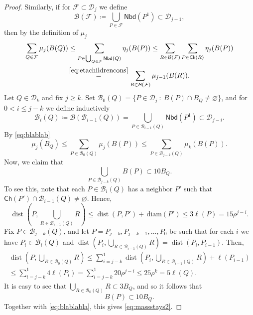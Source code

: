 \documentclass[10pt,a4paper]{amsart}
\def\dB{{\mathcal{B}}}
\def\dF{{\mathcal{F}}}
\def\dist{\mathop\mathrm{dist}} 						%
\newcommand{\Child}{\mathsf{Ch}}
\newcommand{\DD}{\mathcal{D}}
\newcommand{\Nei}{\mathsf{Nbd}}
\newcommand{\diam}{\mathrm{\, diam}}
\begin{document}
\begin{proof}
	Similarly, if for $\dF\subset\DD_j$ we define
	\begin{equation*}
	\mathcal{B}(\dF)\coloneqq \bigcup_{P\in\mathcal{F}}\Nei(P^1)\subset\DD_{j-1},
	\end{equation*}
	then by the definition of $\mu_j$
	\begin{multline}\label{eq:blablab}
	\sum_{Q\in\dF}\mu_j(B(Q))\le \sum_{P\in \bigcup_{Q\in\dF}\Nei(Q)} \eta_j(B(P)) \le \sum_{R\in\dB(\dF)} \sum_{P\in \Child(R)} \eta_j(B(P))\\
	 \overset{\eqref{eq:etachildrencons}}{=} \sum_{R\in\dB(\dF)} \mu_{j-1}(B(R)).
	\end{multline}
	Let $Q\in\DD_k$ and fix $j\ge k$. Set $\dB_0(Q) = \{ P\in\DD_j\ :\ B(P)\cap B_Q\neq\varnothing\}$, and for $0< i \le j-k$ we define inductively
	\begin{equation*}
	\dB_i(Q) \coloneqq \dB(\dB_{i-1}(Q)) = \bigcup_{P\in\dB_{i-1}(Q)}\Nei(P^1)\subset\DD_{j-i}.
	\end{equation*}
	By \eqref{eq:blablab}
	\begin{equation}\label{eq:blablabla}
	\mu_j(B_Q)\le \sum_{P\in\dB_0(Q)}\mu_j(B(P)) \le \sum_{P\in \dB_{j-k}(Q)}\mu_k(B(P)).
	\end{equation}
	Now, we claim that
	\begin{equation*}
	\bigcup_{P\in\dB_{j-k}(Q)}B(P) \subset 10B_Q.
	\end{equation*}
	To see this, note that each $P\in\dB_i(Q)$ has a neighbor $P'$ such that $\Child(P')\cap\dB_{i-1}(Q)\neq\varnothing.$ Hence, 
	\begin{equation*}
	\dist(P,\bigcup_{R\in \dB_{i-1}(Q)}R)\le \dist(P,P')+\diam(P')\le 3\ell(P)=15\rho^{j-i}.
	\end{equation*}
	Fix $P\in\dB_{j-k}(Q)$, and let $P=P_{j-k}, P_{j-k-1},\dots, P_{0}$ be such that for each $i$ we have $P_i\in\dB_i(Q)$ and $\dist(P_i,\bigcup_{R\in \dB_{i-1}(Q)}R)=\dist(P_i,P_{i-1})$. Then,
	\begin{multline*}
		\dist(P,\bigcup_{R\in \dB_{0}(Q)}R)\le \sum_{i=j-k}^{1} \dist(P_i,\bigcup_{R\in \dB_{i-1}(Q)}R) + \ell(P_{i-1})\\
		\le \sum_{i=j-k}^{1} 4\ell(P_{i})=\sum_{i=j-k}^{1} 20\rho^{j-i} \le 25\rho^{k} = 5\ell(Q).
	\end{multline*}
	It is easy to see that $\bigcup_{R\in \dB_{0}(Q)}R\subset 3B_Q$, and so it follows that
	\begin{equation*}
		B(P)\subset 10 B_Q.
	\end{equation*}
	Together with \eqref{eq:blablabla}, this gives \eqref{eq:massstays2}.
\end{proof}
\end{document}

